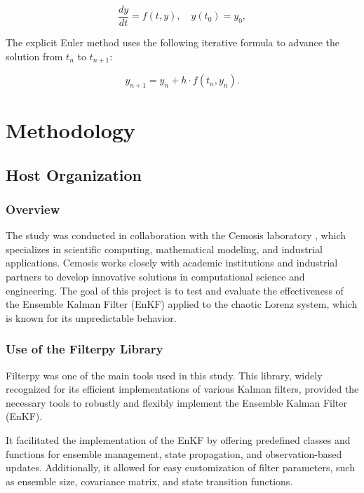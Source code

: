 \documentclass[a4paper,12pt,french]{article}
\begin{document}
$$
\frac{dy}{dt} = f(t, y), \quad y(t_0) = y_0,
$$

The explicit Euler method uses the following iterative formula to advance the solution from $t_n$ to $t_{n+1}$:

$$
y_{n+1} = y_n + h \cdot f(t_n, y_n).
$$ 




\section{Methodology}
\subsection{Host Organization}

\subsubsection{Overview}
 The study was conducted in collaboration with the Cemosis 
 laboratory \cite{cemosis}, which specializes in scientific computing,
 mathematical modeling, and industrial applications. 
 Cemosis works closely with academic institutions and 
 industrial partners to develop innovative solutions in
 computational science and engineering. The goal of this 
 project is to test and evaluate the effectiveness of the
 Ensemble Kalman Filter (EnKF) applied to the chaotic
 Lorenz system, which is known for its unpredictable behavior.

\subsubsection{Use of the Filterpy Library}
Filterpy \cite{filterpy} was one of the main tools used in this study. 
This library, widely recognized for its efficient 
implementations of various Kalman filters, provided the 
necessary tools to robustly and flexibly implement the 
Ensemble Kalman Filter (EnKF).

It facilitated the implementation of the EnKF by offering 
predefined classes and functions for ensemble management, 
state propagation, and observation-based updates. 
Additionally, it allowed for easy customization of filter 
parameters, such as ensemble size, covariance matrix, 
and state transition functions.
\end{document}
